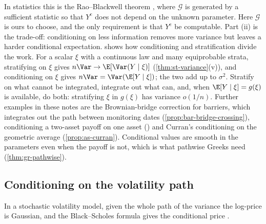 In statistics this is the Rao--Blackwell theorem \citep[Theorem~7.3.17]{casella-berger},
where $\mathcal G$ is generated by a sufficient statistic so that $Y^{\mathrm c}$ does not
depend on the unknown parameter. Here $\mathcal G$ is ours to choose, and the only
requirement is that $Y^{\mathrm c}$ be computable. Part (ii) is the trade-off: conditioning
on less information removes more variance but leaves a harder conditional expectation.
 shows how conditioning and stratification divide the work. For
a scalar $\xi$ with a continuous law and many equiprobable strata, stratifying on $\xi$
gives $n\Var\to\E[\Var(Y\mid\xi)]$ (\cref{thm:st-variance}(v)), and conditioning on $\xi$ gives
$n\Var=\Var(\E[Y\mid\xi])$; the two add up to $\sigma^2$. Stratify on what cannot be integrated,
integrate out what can, and, when $\E[Y\mid\xi]=g(\xi)$ is available, do both: stratifying
$\xi$ in $g(\xi)$ has variance $o(1/n)$. Further examples in these notes are the
Brownian-bridge correction for barriers, which integrates out the path between monitoring
dates (\cref{prop:bar-bridge-crossing}), conditioning a two-asset payoff on one asset
() and Curran's conditioning on the geometric average
(\cref{prop:as-curran}). Conditional values are smooth in the parameters even when the payoff
is not, which is what pathwise Greeks need (\cref{thm:gr-pathwise}).

\subsection{Conditioning on the volatility path}

In a stochastic volatility model, given the whole path of the variance the log-price is
Gaussian, and the Black--Scholes formula gives the conditional price
\citep{hull-white-sv,romano-touzi,willard}.


